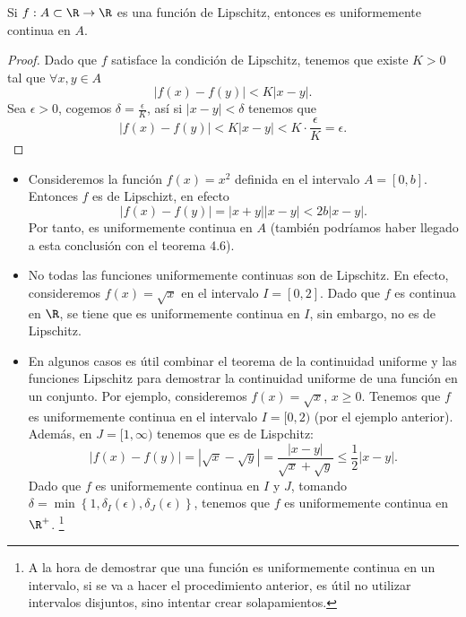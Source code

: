 \begin{ftheorem}[]
\normalfont Si $\displaystyle f : A \subset \R \to \R $ es una función de Lipschitz, entonces es uniformemente continua en $\displaystyle A $.
\end{ftheorem}
\begin{proof}
Dado que $\displaystyle f $ satisface la condición de Lipschitz, tenemos que existe $\displaystyle K > 0 $ tal que $\displaystyle \forall x,y \in A $ 
\[ \left|f\left(x\right)-f\left(y\right)\right| < K \left|x -y\right| .\]
Sea $\displaystyle \epsilon > 0 $, cogemos $\displaystyle \delta = \frac{\epsilon }{K} $, así si $\displaystyle \left|x - y\right| < \delta  $ tenemos que
\[ \left|f\left(x\right)-f\left(y\right)\right| < K \left|x-y\right| < K \cdot \frac{\epsilon }{K}= \epsilon .\]
\end{proof}
\begin{eg}
\normalfont 
\begin{itemize}
	\item Consideremos la función $\displaystyle f\left(x\right) = x^{2} $ definida en el intervalo $\displaystyle A = [0,b] $. Entonces $\displaystyle f $ es de Lipschizt, en efecto
		\[ \left|f\left(x\right)-f\left(y\right)\right| = \left|x + y\right| \left|x -y\right| < 2b \left|x-y\right| .\]
	Por tanto, es uniformemente continua en $\displaystyle A $ (también podríamos haber llegado a esta conclusión con el teorema 4.6).
\item No todas las funciones uniformemente continuas son de Lipschitz. En efecto, consideremos $\displaystyle f\left(x\right) = \sqrt{x} $ en el intervalo $\displaystyle I = [0,2] $. Dado que $\displaystyle f $ es continua en $\displaystyle \R $, se tiene que es uniformemente continua en $\displaystyle I $, sin embargo, no es de Lipschitz.
\item En algunos casos es útil combinar el teorema de la continuidad uniforme y las funciones Lipschitz para demostrar la continuidad uniforme de una función en un conjunto. Por ejemplo, consideremos $\displaystyle f\left(x\right) = \sqrt{x} $, $\displaystyle x \geq 0 $. Tenemos que $\displaystyle f $ es uniformemente continua en el intervalo $\displaystyle I =[0,2) $ (por el ejemplo anterior). Además, en $\displaystyle J =[1,\infty) $ tenemos que es de Lispchitz:
	\[ \left|f\left(x\right)-f\left(y\right)\right| = \left|\sqrt{x}-\sqrt{y}\right| = \frac{ \left|x-y\right|}{\sqrt{x}+\sqrt{y}} \leq \frac{1}{2} \left|x -y\right| .\]
	Dado que $\displaystyle f $ es uniformemente continua en $\displaystyle I $ y $\displaystyle J $, tomando $\displaystyle \delta = \min \left\{ 1, \delta_{I}\left(\epsilon \right), \delta _{J}\left(\epsilon \right)\right\}  $, tenemos que $\displaystyle f $ es uniformemente continua en $\displaystyle \R^{+} $. \footnote{A la hora de demostrar que una función es uniformemente continua en un intervalo, si se va a hacer el procedimiento anterior, es útil no utilizar intervalos disjuntos, sino intentar crear solapamientos.} 
\end{itemize}
\end{eg}
